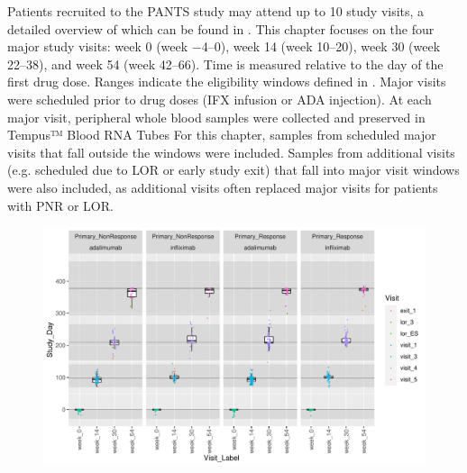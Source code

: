 \begin{outline}
%
%
%
Patients recruited to the \gls{PANTS} study may attend up to 10 study visits, a detailed overview of which can be found in \textcite{kennedy2019PredictorsAntiTNFTreatment}. 
This chapter focuses on the four major study visits: week 0 (week \numrange{-4}{0}), week 14 (week \numrange{10}{20}), week 30 (week \numrange{22}{38}), and week 54 (week \numrange{42}{66}).
Time is measured relative to the day of the first drug dose.
Ranges indicate the eligibility windows defined in \textcite{kennedy2019PredictorsAntiTNFTreatment}.
Major visits were scheduled prior to drug doses (IFX infusion or ADA injection).
At each major visit, peripheral whole blood samples were collected and preserved in Tempus™ Blood RNA Tubes
For this chapter, samples from scheduled major visits that fall outside the windows were included.
Samples from additional visits (e.g. scheduled due to \gls{LOR} or early study exit) that fall into major visit windows were also included, as additional visits often replaced major visits for patients with \gls{PNR} or \gls{LOR}.

\begin{figure}
    \centering
    \includegraphics[width=1.0\textwidth,page=1]{mainmatter/figures/chapter_04/process_pheno.pheno_filtered_dge.Study_Day_vs_Visit_Label.pdf}
    \caption{}
    \label{fig:multipants_studyDay_boxplots}
\end{figure}


\end{outline}
